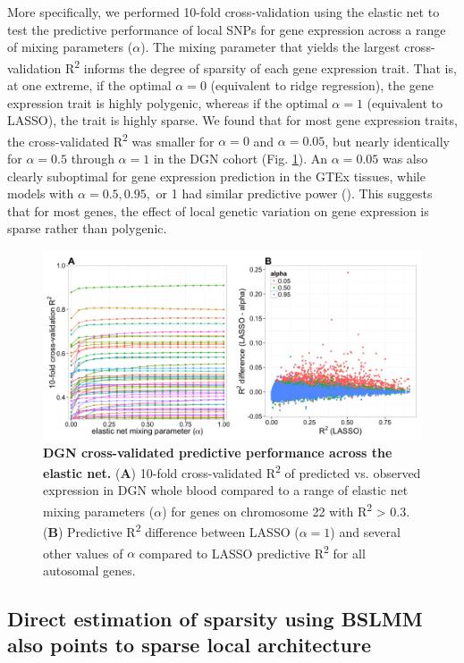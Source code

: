 \documentclass[10pt,letterpaper]{article}
\begin{document}
More specifically, we performed 10-fold cross-validation using the elastic net \cite{Zou_2005} to test the predictive performance of local SNPs for gene expression across a range of mixing parameters ($\alpha$). The mixing parameter that yields the largest cross-validation R\textsuperscript{2} informs the degree of sparsity of each gene expression trait. That is, at one extreme, if the optimal \(\alpha=0\) (equivalent to ridge regression), the gene expression trait is highly polygenic, whereas if the optimal \(\alpha=1\) (equivalent to LASSO), the trait is highly sparse. We found that for most gene expression traits, the cross-validated R\textsuperscript{2} was smaller for \(\alpha=0\) and \(\alpha=0.05\), but nearly identically for \(\alpha=0.5\) through \(\alpha=1\) in the DGN cohort (Fig. \ref{fig-dgn-en}). An \(\alpha=0.05\) was also clearly suboptimal for gene expression prediction in the GTEx tissues, while models with \(\alpha=0.5,0.95,\) or 1 had similar predictive power (). This suggests that for most genes, the effect of local genetic variation on gene expression is sparse rather than polygenic.

\begin{figure}[h]
\includegraphics[width=12cm]{Figures/Fig-DGN-EN.png}
\caption{{\bf DGN cross-validated predictive performance across the elastic net.} 
(\textbf{A}) 10-fold cross-validated R\textsuperscript{2} of
predicted vs. observed expression in DGN whole blood compared to a range
of elastic net mixing parameters (\(\alpha\)) for genes on chromosome 22
with R\textsuperscript{2} \textgreater{} 0.3. (\textbf{B}) Predictive
R\textsuperscript{2} difference between LASSO (\(\alpha = 1\)) and
several other values of \(\alpha\) compared to LASSO predictive
R\textsuperscript{2} for all autosomal genes.}
\label{fig-dgn-en}
\end{figure}

\subsection*{Direct estimation of sparsity using BSLMM also points to sparse local architecture}
\end{document}
